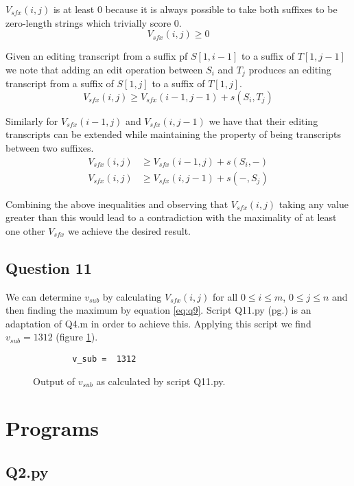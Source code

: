 \documentclass[a4paper]{article}
\begin{document}
$V_{sfx}(i,j)$ is at least $0$ because it is always possible to take both suffixes to be zero-length strings which trivially score 0.
\[ V_{sfx}(i,j) \geq 0 \]

Given an editing transcript from a suffix pf $S[1,i-1]$ to a suffix of $T[1,j-1]$ we note that adding an edit operation between $S_i$ and $T_j$ produces an editing transcript from a suffix of $S[1,j]$ to a suffix of $T[1,j]$.
\[ V_{sfx}(i,j) \geq V_{sfx}(i-1,j-1) + s(S_i,T_j) \]

Similarly for $V_{sfx}(i-1,j)$ and $V_{sfx}(i,j-1)$ we have that their editing transcripts can be extended while maintaining the property of being transcripts between two suffixes.
\begin{align*}
    V_{sfx}(i,j) &\geq V_{sfx}(i-1,j) + s(S_i,-) \\
    V_{sfx}(i,j) &\geq V_{sfx}(i,j-1) + s(-,S_j)
\end{align*}

Combining the above inequalities and observing that $V_{sfx}(i,j)$ taking any value greater than this would lead to a contradiction with the maximality of at least one other $V_{sfx}$ we achieve the desired result.

\subsection*{Question 11}

We can determine $v_{sub}$ by calculating $V_{sfx}(i,j)$ for all $0\leq i\leq m$, $0\leq j \leq n$ and then finding the maximum by equation \ref{eq:q9}. Script Q11.py (pg.\pageref{PQ11}) is an adaptation of Q4.m in order to achieve this. Applying this script we find $v_{sub}=1312$ (figure \ref{fig:q11}).

\begin{figure}[H]
    \centering
    \begin{verbatim}
        v_sub =  1312
    \end{verbatim}
    \caption{Output of $v_{sub}$ as calculated by script Q11.py.}
    \label{fig:q11}
\end{figure}

\pagebreak
\section*{Programs}

\subsection*{Q2.py}\label{PQ2}
\inputminted[frame=single,linenos,framesep=2mm,baselinestretch=1]{python}{Q2.py}
\end{document}
